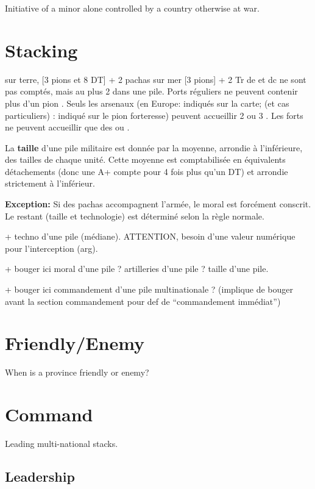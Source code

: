 Initiative of a minor alone controlled by a country otherwise at war.

\section{Stacking}\label{chMilitary:Stacking}
\aparag[Empilement]
\bparag sur terre, [3 pions et 8 DT] + 2 pachas
\bparag  sur mer [3 pions] + 2 Tr
\bparag de et dc ne sont pas comptés, mais au plus 2 dans une pile.
 Ports réguliers ne peuvent contenir plus d'un pion
\FLEET.  Seuls les arsenaux (en Europe: indiqués sur la carte; \ROTW (et cas
particuliers) : indiqué sur le pion forteresse) peuvent accueillir 2 ou 3
\FLEET.  Les forts ne peuvent accueillir que des \DN ou \NDE.

La \textbf{taille} d'une pile militaire est donnée par la moyenne,
arrondie à l'inférieure, des tailles de chaque unité. Cette moyenne
est comptabilisée en équivalents détachements (donc une A+
compte pour 4 fois plus qu'un DT) et arrondie strictement à l'inférieur.

\textbf{Exception:} Si des pachas accompagnent l'armée, le moral est forcément
conscrit. Le restant (taille et technologie) est déterminé selon la règle
normale.

+ techno d'une pile (médiane). ATTENTION, besoin d'une valeur numérique pour
l'interception (arg).

+ bouger ici moral d'une pile ? artilleries d'une pile ? taille d'une pile.

+ bouger ici commandement d'une pile multinationale ? (implique de bouger
avant la section commandement pour def de ``commandement immédiat'')

\section{Friendly/Enemy}
When is a province friendly or enemy?

\section{Command}
Leading multi-national stacks.

\subsection{Leadership}\label{chMilitary:Leadership}
